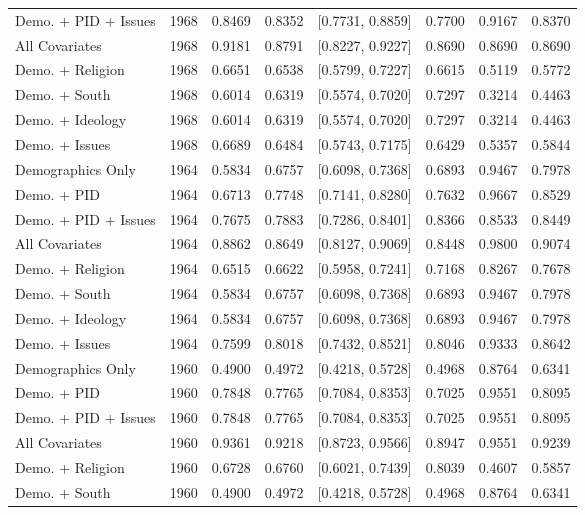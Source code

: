 \begin{longtable}{lrrrlrrr}
  Demo. + PID + Issues & 1968 & 0.8469 & 0.8352 & [0.7731, 0.8859] & 0.7700 & 0.9167 & 0.8370 \\ 
  All Covariates & 1968 & 0.9181 & 0.8791 & [0.8227, 0.9227] & 0.8690 & 0.8690 & 0.8690 \\ 
  Demo. + Religion & 1968 & 0.6651 & 0.6538 & [0.5799, 0.7227] & 0.6615 & 0.5119 & 0.5772 \\ 
  Demo. + South & 1968 & 0.6014 & 0.6319 & [0.5574, 0.7020] & 0.7297 & 0.3214 & 0.4463 \\ 
  Demo. + Ideology & 1968 & 0.6014 & 0.6319 & [0.5574, 0.7020] & 0.7297 & 0.3214 & 0.4463 \\ 
  Demo. + Issues & 1968 & 0.6689 & 0.6484 & [0.5743, 0.7175] & 0.6429 & 0.5357 & 0.5844 \\ 
  Demographics Only & 1964 & 0.5834 & 0.6757 & [0.6098, 0.7368] & 0.6893 & 0.9467 & 0.7978 \\ 
  Demo. + PID & 1964 & 0.6713 & 0.7748 & [0.7141, 0.8280] & 0.7632 & 0.9667 & 0.8529 \\ 
  Demo. + PID + Issues & 1964 & 0.7675 & 0.7883 & [0.7286, 0.8401] & 0.8366 & 0.8533 & 0.8449 \\ 
  All Covariates & 1964 & 0.8862 & 0.8649 & [0.8127, 0.9069] & 0.8448 & 0.9800 & 0.9074 \\ 
  Demo. + Religion & 1964 & 0.6515 & 0.6622 & [0.5958, 0.7241] & 0.7168 & 0.8267 & 0.7678 \\ 
  Demo. + South & 1964 & 0.5834 & 0.6757 & [0.6098, 0.7368] & 0.6893 & 0.9467 & 0.7978 \\ 
  Demo. + Ideology & 1964 & 0.5834 & 0.6757 & [0.6098, 0.7368] & 0.6893 & 0.9467 & 0.7978 \\ 
  Demo. + Issues & 1964 & 0.7599 & 0.8018 & [0.7432, 0.8521] & 0.8046 & 0.9333 & 0.8642 \\ 
  Demographics Only & 1960 & 0.4900 & 0.4972 & [0.4218, 0.5728] & 0.4968 & 0.8764 & 0.6341 \\ 
  Demo. + PID & 1960 & 0.7848 & 0.7765 & [0.7084, 0.8353] & 0.7025 & 0.9551 & 0.8095 \\ 
  Demo. + PID + Issues & 1960 & 0.7848 & 0.7765 & [0.7084, 0.8353] & 0.7025 & 0.9551 & 0.8095 \\ 
  All Covariates & 1960 & 0.9361 & 0.9218 & [0.8723, 0.9566] & 0.8947 & 0.9551 & 0.9239 \\ 
  Demo. + Religion & 1960 & 0.6728 & 0.6760 & [0.6021, 0.7439] & 0.8039 & 0.4607 & 0.5857 \\ 
  Demo. + South & 1960 & 0.4900 & 0.4972 & [0.4218, 0.5728] & 0.4968 & 0.8764 & 0.6341 \\ 

\end{longtable}
